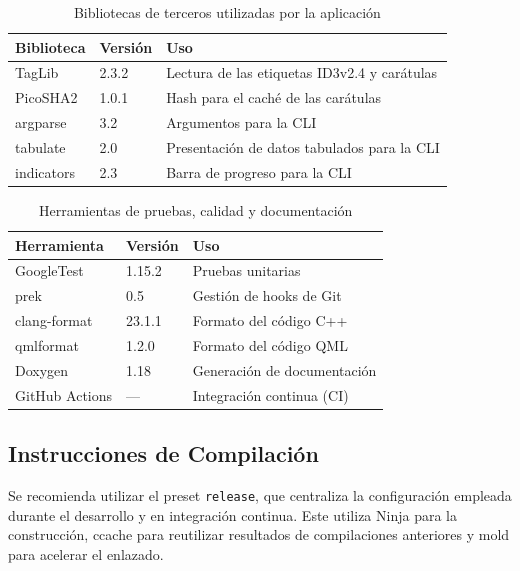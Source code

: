 \begin{table}[htbp]
	\centering
	\begin{tabularx}{\textwidth}{@{}llX@{}}
		\toprule
		Biblioteca & Versión & Uso                                          \\
		\midrule
		TagLib     & 2.3.2   & Lectura de las etiquetas ID3v2.4 y carátulas \\
		PicoSHA2   & 1.0.1   & Hash para el caché de las carátulas          \\
		argparse   & 3.2     & Argumentos para la CLI                       \\
		tabulate   & 2.0     & Presentación de datos tabulados para la CLI  \\
		indicators & 2.3     & Barra de progreso para la CLI                \\
		\bottomrule
	\end{tabularx}
	\caption{Bibliotecas de terceros utilizadas por la aplicación}
\end{table}

\begin{table}[htbp]
	\centering
	\begin{tabularx}{\textwidth}{@{}llX@{}}
		\toprule
		Herramienta    & Versión & Uso                         \\
		\midrule
		GoogleTest     & 1.15.2  & Pruebas unitarias           \\
		prek           & 0.5     & Gestión de hooks de Git     \\
		clang-format   & 23.1.1  & Formato del código C++      \\
		qmlformat      & 1.2.0   & Formato del código QML      \\
		Doxygen        & 1.18    & Generación de documentación \\
		GitHub Actions & ---     & Integración continua (CI)   \\
		\bottomrule
	\end{tabularx}
	\caption{Herramientas de pruebas, calidad y documentación}
\end{table}

\subsection{Instrucciones de Compilación}

Se recomienda utilizar el preset \texttt{release}, que centraliza la
configuración empleada durante el desarrollo y en integración continua.
Este utiliza Ninja para la construcción, ccache para reutilizar resultados
de compilaciones anteriores y mold para acelerar el enlazado.

